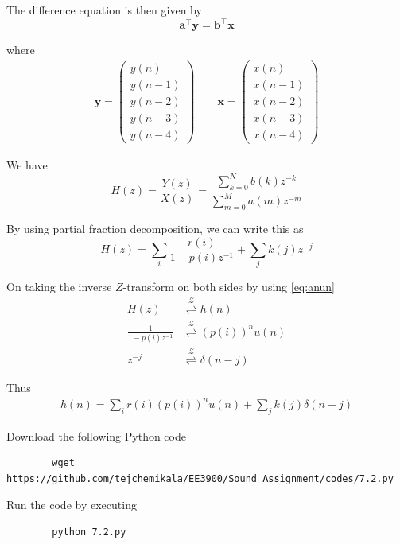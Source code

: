 \documentclass[journal,12pt,twocolumn]{IEEEtran}
\providecommand{\brak}[1]{\ensuremath{\left(#1\right)}}
\providecommand{\ztrans}{\overset{\mathcal{Z}}{ \rightleftharpoons}}
\let\vec\mathbf
\numberwithin{equation}{section}
\renewcommand\thesection{\arabic{section}}
\newcommand{\myvec}[1]{\ensuremath{\begin{pmatrix}#1\end{pmatrix}}}
\begin{document}
\begin{enumerate}[label=\thesection.\arabic*]
	The difference equation is then given by
	\begin{equation}
		\vec{a}^\top \vec{y} = \vec{b}^\top \vec{x} 
	\end{equation}
	
	where
	\begin{align}
		\vec{y} = \myvec{y(n) \\ y(n-1) \\ y(n-2) \\ y(n-3) \\ y(n-4)} \qquad
		\vec{x} = \myvec{x(n) \\ x(n-1) \\ x(n-2) \\ x(n-3) \\ x(n-4)}
	\end{align}
	
	We have
	\begin{equation}
		H(z) = \frac{Y(z)}{X(z)} = \frac{\sum _{k=0}^{N}b\brak{k} z^{-k}}{\sum _{m=0}^{M}a\brak{m} z^{-m}}
	\end{equation}
	
	By using partial fraction decomposition, we can write this as
	\begin{equation}
		H(z) = \sum_i \frac{r(i)}{1-p(i)z^{-1}} + \sum_j k(j)z^{-j}
	\end{equation}
	
	On taking the inverse $Z$-transform on both sides by using \eqref{eq:anun}
	\begin{align}
		H(z) &\ztrans h(n) \\
		\frac{1}{1-p(i)z^{-1}} &\ztrans \brak{p(i)}^nu(n) \\
		z^{-j} &\ztrans \delta(n-j) 
	\end{align}
	
	Thus
	\begin{align}
		h(n) = \sum_i r(i)\brak{p(i)}^nu(n) + \sum_j k(j)\delta(n-j)
	\end{align}
	
	Download the following Python code
	\begin{lstlisting}
		wget https://github.com/tejchemikala/EE3900/Sound_Assignment/codes/7.2.py
	\end{lstlisting}
	
	Run the code by executing
	\begin{lstlisting}
		python 7.2.py
	\end{lstlisting}
	

\end{enumerate}
\end{document}
